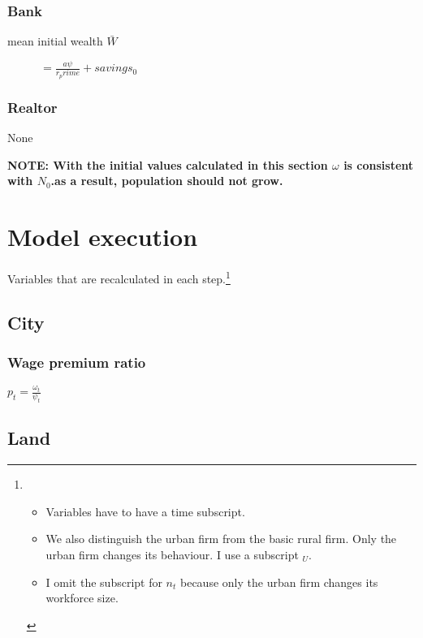 \subsubsection{Bank}
\begin{description}
\item[mean initial wealth $\bar W$] $= \frac {a\psi}{r_prime}+savings_0$
\end{description}

\subsubsection{Realtor}
\begin{description}
\item[None] 
\end{description}


\textbf{NOTE: With the initial values calculated in this section $\omega$ is consistent with $N_0$.as a result, population should not grow. }





\section{Model execution}
Variables that are recalculated in each step.\footnote{\begin{itemize}
    \item Variables have to have a time subscript. 
    \item We also distinguish the urban firm from the basic rural firm.  Only the urban firm changes its behaviour.  I use a subscript $_U$. 
    \item I omit the subscript for $n_t$ because only the urban firm changes its workforce size.
\end{itemize} }


\subsection{City}
\subsubsection{Wage premium ratio}

$p_t= \frac{\omega_t}{\psi_t}$ 


    \subsection{Land}
